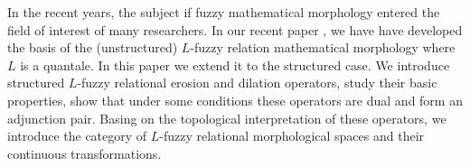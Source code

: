  In the recent years, the subject if fuzzy mathematical morphology entered the field of interest of many researchers. In our recent paper \cite{SoUl1}, we have have developed the basis of the (unstructured) $L$-fuzzy relation mathematical morphology where $L$ is a quantale. In this paper we extend  it to the structured case. We introduce structured $L$-fuzzy relational erosion and dilation operators, study their basic properties, show that under some conditions  these operators are dual and form an adjunction pair. Basing on the topological interpretation of these operators, we introduce the category of  $L$-fuzzy relational morphological spaces and their continuous transformations. 



